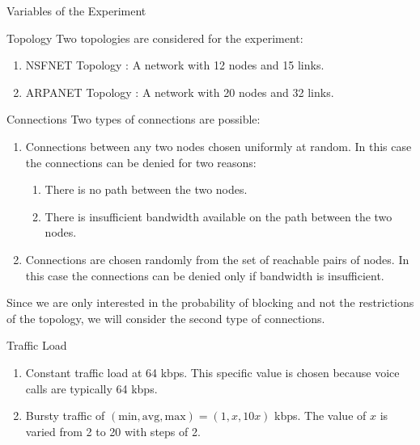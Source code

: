 \begin{section}{Variables of the Experiment}

    \begin{subsection}{Topology}
        Two topologies are considered for the experiment:
        \begin{enumerate}
            \item NSFNET Topology : A network with 12 nodes and 15 links.
            \item ARPANET Topology : A network with 20 nodes and 32 links.
        \end{enumerate}
    \end{subsection}

    \begin{subsection}{Connections}
    Two types of connections are possible:
    \begin{enumerate}
        \item Connections between any two nodes chosen uniformly at random. In this case the connections can be denied for two reasons:
        \begin{enumerate}
            \item There is no path between the two nodes.
            \item There is insufficient bandwidth available on the path between the two nodes.
        \end{enumerate}
        \item Connections are chosen randomly from the set of reachable pairs of nodes. In this case the connections can be denied only if bandwidth is insufficient.
    \end{enumerate}
    Since we are only interested in the probability of blocking and not the restrictions of the topology, we will consider the second type of connections.
    \end{subsection}

    \begin{subsection}{Traffic Load}
        \begin{enumerate}
            \item Constant traffic load at 64 kbps. This specific value is chosen because voice calls are typically 64 kbps.
            \item Bursty traffic of $(\text{min}, \text{avg}, \text{max}) = (1, x, 10x)$ kbps. The value of $x$ is varied from 2 to 20 with steps of 2.
        \end{enumerate}
    \end{subsection}
    


\end{section}

